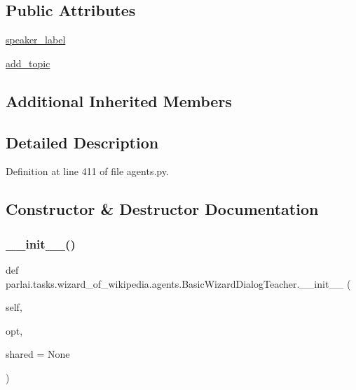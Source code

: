 \subsection*{Public Attributes}
\begin{DoxyCompactItemize}
\item 
\hyperlink{classparlai_1_1tasks_1_1wizard__of__wikipedia_1_1agents_1_1BasicWizardDialogTeacher_a7cba3c53db23ee567eeafa10b1f48840}{speaker\+\_\+label}
\item 
\hyperlink{classparlai_1_1tasks_1_1wizard__of__wikipedia_1_1agents_1_1BasicWizardDialogTeacher_a5d822b8cbc645ad8c451c6ff3fca9af3}{add\+\_\+topic}
\end{DoxyCompactItemize}
\subsection*{Additional Inherited Members}


\subsection{Detailed Description}


Definition at line 411 of file agents.\+py.



\subsection{Constructor \& Destructor Documentation}
\mbox{\label{classparlai_1_1tasks_1_1wizard__of__wikipedia_1_1agents_1_1BasicWizardDialogTeacher_acdbd15d6e87bcc9e1c0482284a8119ec}} 
\subsubsection{\texorpdfstring{\+\_\+\+\_\+init\+\_\+\+\_\+()}{\_\_init\_\_()}}
{\footnotesize\ttfamily def parlai.\+tasks.\+wizard\+\_\+of\+\_\+wikipedia.\+agents.\+Basic\+Wizard\+Dialog\+Teacher.\+\_\+\+\_\+init\+\_\+\+\_\+ (\begin{DoxyParamCaption}\item[{}]{self,  }\item[{}]{opt,  }\item[{}]{shared = {\ttfamily None} }\end{DoxyParamCaption})}




